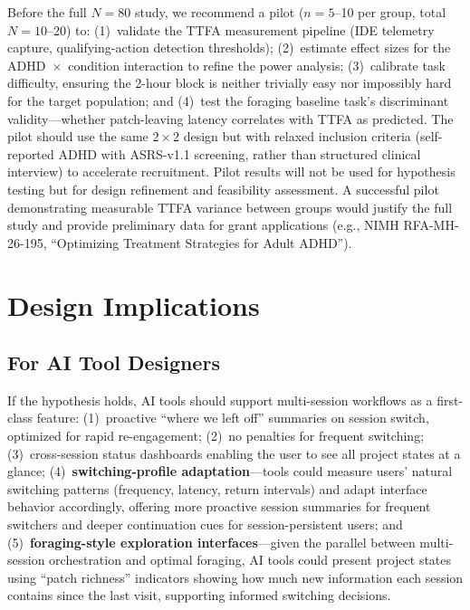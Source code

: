 \documentclass[sigconf,nonacm]{acmart}
\begin{document}
Before the full $N = 80$ study, we recommend a pilot ($n = 5$--10 per group, total $N = 10$--20) to: (1)~validate the TTFA measurement pipeline (IDE telemetry capture, qualifying-action detection thresholds); (2)~estimate effect sizes for the ADHD~$\times$~condition interaction to refine the power analysis; (3)~calibrate task difficulty, ensuring the 2-hour block is neither trivially easy nor impossibly hard for the target population; and (4)~test the foraging baseline task's discriminant validity---whether patch-leaving latency correlates with TTFA as predicted. The pilot should use the same $2 \times 2$ design but with relaxed inclusion criteria (self-reported ADHD with ASRS-v1.1 screening, rather than structured clinical interview) to accelerate recruitment. Pilot results will not be used for hypothesis testing but for design refinement and feasibility assessment. A successful pilot demonstrating measurable TTFA variance between groups would justify the full study and provide preliminary data for grant applications (e.g., NIMH RFA-MH-26-195, ``Optimizing Treatment Strategies for Adult ADHD'').

\section{Design Implications}
\label{sec:design}

\subsection{For AI Tool Designers}

If the hypothesis holds, AI tools should support multi-session workflows as a first-class feature: (1)~proactive ``where we left off'' summaries on session switch, optimized for rapid re-engagement; (2)~no penalties for frequent switching; (3)~cross-session status dashboards enabling the user to see all project states at a glance; (4)~\textbf{switching-profile adaptation}---tools could measure users' natural switching patterns (frequency, latency, return intervals) and adapt interface behavior accordingly, offering more proactive session summaries for frequent switchers and deeper continuation cues for session-persistent users; and (5)~\textbf{foraging-style exploration interfaces}---given the parallel between multi-session orchestration and optimal foraging, AI tools could present project states using ``patch richness'' indicators showing how much new information each session contains since the last visit, supporting informed switching decisions.
\end{document}
